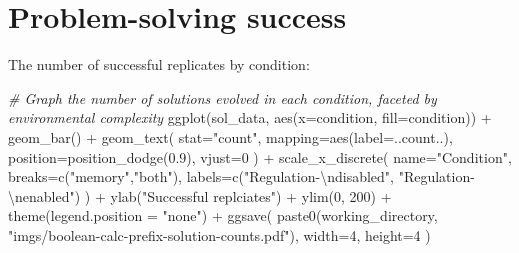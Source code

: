 \documentclass[
]{book}
\newenvironment{Shaded}{\begin{snugshade}}{\end{snugshade}}
\newcommand{\AttributeTok}[1]{\textcolor[rgb]{0.77,0.63,0.00}{#1}}
\newcommand{\CommentTok}[1]{\textcolor[rgb]{0.56,0.35,0.01}{\textit{#1}}}
\newcommand{\DecValTok}[1]{\textcolor[rgb]{0.00,0.00,0.81}{#1}}
\newcommand{\DocumentationTok}[1]{\textcolor[rgb]{0.56,0.35,0.01}{\textbf{\textit{#1}}}}
\newcommand{\FloatTok}[1]{\textcolor[rgb]{0.00,0.00,0.81}{#1}}
\newcommand{\FunctionTok}[1]{\textcolor[rgb]{0.00,0.00,0.00}{#1}}
\newcommand{\NormalTok}[1]{#1}
\newcommand{\OtherTok}[1]{\textcolor[rgb]{0.56,0.35,0.01}{#1}}
\newcommand{\SpecialCharTok}[1]{\textcolor[rgb]{0.00,0.00,0.00}{#1}}
\newcommand{\StringTok}[1]{\textcolor[rgb]{0.31,0.60,0.02}{#1}}
\begin{document}
\begin{Shaded}
\end{Shaded}

\hypertarget{problem-solving-success-2}{%
\section{Problem-solving success}\label{problem-solving-success-2}}

The number of successful replicates by condition:

\begin{Shaded}
\begin{Highlighting}[]
\CommentTok{\# Graph the number of solutions evolved in each condition, faceted by environmental complexity}
\FunctionTok{ggplot}\NormalTok{(sol\_data, }\FunctionTok{aes}\NormalTok{(}\AttributeTok{x=}\NormalTok{condition, }\AttributeTok{fill=}\NormalTok{condition)) }\SpecialCharTok{+}
  \FunctionTok{geom\_bar}\NormalTok{() }\SpecialCharTok{+}
  \FunctionTok{geom\_text}\NormalTok{(}
    \AttributeTok{stat=}\StringTok{"count"}\NormalTok{,}
    \AttributeTok{mapping=}\FunctionTok{aes}\NormalTok{(}\AttributeTok{label=}\NormalTok{..count..),}
    \AttributeTok{position=}\FunctionTok{position\_dodge}\NormalTok{(}\FloatTok{0.9}\NormalTok{),}
    \AttributeTok{vjust=}\DecValTok{0}
\NormalTok{  ) }\SpecialCharTok{+}
  \FunctionTok{scale\_x\_discrete}\NormalTok{(}
    \AttributeTok{name=}\StringTok{"Condition"}\NormalTok{,}
    \AttributeTok{breaks=}\FunctionTok{c}\NormalTok{(}\StringTok{"memory"}\NormalTok{,}\StringTok{"both"}\NormalTok{),}
    \AttributeTok{labels=}\FunctionTok{c}\NormalTok{(}\StringTok{"Regulation{-}}\SpecialCharTok{\textbackslash{}n}\StringTok{disabled"}\NormalTok{, }\StringTok{"Regulation{-}}\SpecialCharTok{\textbackslash{}n}\StringTok{enabled"}\NormalTok{)}
\NormalTok{  ) }\SpecialCharTok{+}
  \FunctionTok{ylab}\NormalTok{(}\StringTok{"Successful replciates"}\NormalTok{) }\SpecialCharTok{+}
  \FunctionTok{ylim}\NormalTok{(}\DecValTok{0}\NormalTok{, }\DecValTok{200}\NormalTok{) }\SpecialCharTok{+}
  \FunctionTok{theme}\NormalTok{(}\AttributeTok{legend.position =} \StringTok{"none"}\NormalTok{) }\SpecialCharTok{+}
  \FunctionTok{ggsave}\NormalTok{(}
    \FunctionTok{paste0}\NormalTok{(working\_directory, }\StringTok{"imgs/boolean{-}calc{-}prefix{-}solution{-}counts.pdf"}\NormalTok{),}
    \AttributeTok{width=}\DecValTok{4}\NormalTok{,}
    \AttributeTok{height=}\DecValTok{4}
\NormalTok{  )}
\end{Highlighting}
\end{Shaded}
\end{document}
